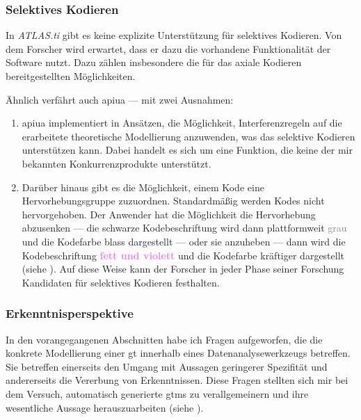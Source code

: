 \subsubsection{Selektives Kodieren}
\label{sec:apiua-selective-coding}

In \textit{ATLAS.ti} gibt es keine explizite Unterstützung für selektives Kodieren. Von dem Forscher wird erwartet, dass er dazu die vorhandene Funktionalität der Software nutzt. Dazu zählen insbesondere die für das axiale Kodieren bereitgestellten Möglichkeiten.

Ähnlich verfährt auch \gls{apiua} --- mit zwei Ausnahmen:
\begin{enumerate}
	\item \gls{apiua} implementiert in Ansätzen, die Möglichkeit, Interferenzregeln auf die erarbeitete theoretische Modellierung anzuwenden, was das selektive Kodieren unterstützen kann. Dabei handelt es sich um eine Funktion, die keine der mir bekannten Konkurrenzprodukte unterstützt.
	\item Darüber hinaus gibt es die Möglichkeit, einem Kode eine Hervorhebungsgruppe zuzuordnen. Standardmäßig werden Kodes nicht hervorgehoben. Der Anwender hat die Möglichkeit die Hervorhebung abzusenken --- die schwarze Kodebeschriftung wird dann plattformweit \textcolor{gray}{grau} und die Kodefarbe blass dargestellt --- oder sie anzuheben --- dann wird die Kodebeschriftung \textbf{\textcolor{violet}{fett und violett}} und die Kodefarbe kräftiger dargestellt (siehe ). Auf diese Weise kann der Forscher in jeder Phase seiner Forschung Kandidaten für selektives Kodieren festhalten.
\end{enumerate}




\subsubsection{Erkenntnisperspektive}
\label{sec:Erkenntnisperspektive}

In den vorangegangenen Abschnitten habe ich Fragen aufgeworfen, die die konkrete Modellierung einer \acrfull{gt} innerhalb eines Datenanalysewerkzeugs betreffen. Sie betreffen einerseits den Umgang mit Aussagen geringerer Spezifität und andererseits die Vererbung von Erkenntnissen. Diese Fragen stellten sich mir bei dem Versuch, automatisch generierte \glspl{gtm} zu verallgemeinern und ihre wesentliche Aussage herauszuarbeiten (siehe ).


